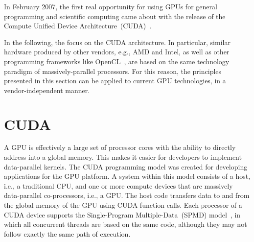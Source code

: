 In February 2007, the first real opportunity for using GPUs for general
programming and scientific computing came about with the release of
the Compute Unified Device Architecture~(CUDA)~\cite{CUDA}.

In the following, the focus on the CUDA architecture. In particular,
similar hardware produced by other vendors, e.g., AMD and Intel, as
well as other programming frameworks like OpenCL~\cite{Stone_OpenCL.A.parallel.programming.standard:2010},
are based on the same technology paradigm of massively-parallel processors.
For this reason, the principles presented in this section can be applied
to current GPU technologies, in a vendor-independent manner.


\section{CUDA \label{sec:02-CUDA}}

A GPU is effectively a large set of processor cores with the ability
to directly address into a global memory. This makes it easier for
developers to implement data-parallel kernels. The CUDA programming
model \cite{CUDA} was created for developing applications for the
GPU platform. A system within this model consists of a host, i.e.,
a traditional CPU, and one or more compute devices that are massively
data-parallel co-processors, i.e., a GPU. The host code transfers
data to and from the global memory of the GPU using CUDA-function
calls. Each processor of a CUDA device supports the Single-Program
Multiple-Data~(SPMD)
model~\cite{Atallah-Algorithms_and_theory_of_computation:2002},
in which all concurrent threads are based on the same code, although
they may not follow exactly the same path of execution.

